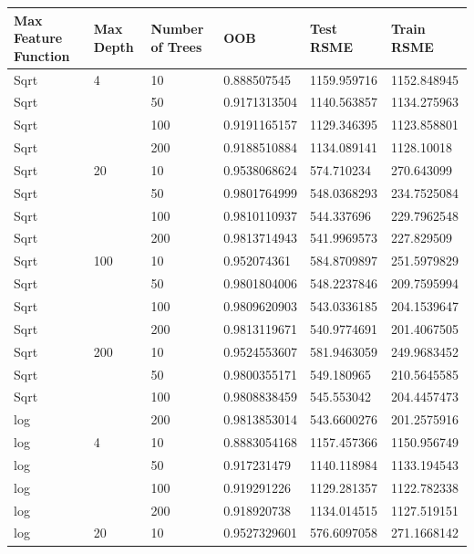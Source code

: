 \documentclass[11pt,letterpaper]{article}
\begin{document}
\begin{table}[!ht]
    \centering
    \begin{tabular}{|l|l|l|l|l|l|}
    \hline
        Max Feature Function & Max Depth & Number of Trees & OOB & Test RSME & Train RSME \\ \hline
        Sqrt & 4 & 10 & 0.888507545 & 1159.959716 & 1152.848945 \\ \hline
        Sqrt & ~ & 50 & 0.9171313504 & 1140.563857 & 1134.275963 \\ \hline
        Sqrt & ~ & 100 & 0.9191165157 & 1129.346395 & 1123.858801 \\ \hline
        Sqrt & ~ & 200 & 0.9188510884 & 1134.089141 & 1128.10018 \\ \hline
        Sqrt & 20 & 10 & 0.9538068624 & 574.710234 & 270.643099 \\ \hline
        Sqrt & ~ & 50 & 0.9801764999 & 548.0368293 & 234.7525084 \\ \hline
        Sqrt & ~ & 100 & 0.9810110937 & 544.337696 & 229.7962548 \\ \hline
        Sqrt & ~ & 200 & 0.9813714943 & 541.9969573 & 227.829509 \\ \hline
        Sqrt & 100 & 10 & 0.952074361 & 584.8709897 & 251.5979829 \\ \hline
        Sqrt & ~ & 50 & 0.9801804006 & 548.2237846 & 209.7595994 \\ \hline
        Sqrt & ~ & 100 & 0.9809620903 & 543.0336185 & 204.1539647 \\ \hline
        Sqrt & ~ & 200 & 0.9813119671 & 540.9774691 & 201.4067505 \\ \hline
        Sqrt & 200 & 10 & 0.9524553607 & 581.9463059 & 249.9683452 \\ \hline
        Sqrt & ~ & 50 & 0.9800355171 & 549.180965 & 210.5645585 \\ \hline
        Sqrt & ~ & 100 & 0.9808838459 & 545.553042 & 204.4457473 \\ \hline
        log & ~ & 200 & 0.9813853014 & 543.6600276 & 201.2575916 \\ \hline
        log & 4 & 10 & 0.8883054168 & 1157.457366 & 1150.956749 \\ \hline
        log & ~ & 50 & 0.917231479 & 1140.118984 & 1133.194543 \\ \hline
        log & ~ & 100 & 0.919291226 & 1129.281357 & 1122.782338 \\ \hline
        log & ~ & 200 & 0.918920738 & 1134.014515 & 1127.519151 \\ \hline
        log & 20 & 10 & 0.9527329601 & 576.6097058 & 271.1668142 \\ \hline

\end{tabular}
\end{table}
\end{document}
